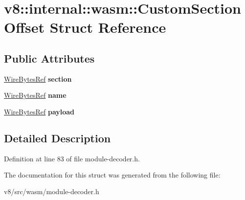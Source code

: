 \hypertarget{structv8_1_1internal_1_1wasm_1_1CustomSectionOffset}{}\section{v8\+:\+:internal\+:\+:wasm\+:\+:Custom\+Section\+Offset Struct Reference}
\label{structv8_1_1internal_1_1wasm_1_1CustomSectionOffset}
\subsection*{Public Attributes}
\begin{DoxyCompactItemize}
\item 
\mbox{\label{structv8_1_1internal_1_1wasm_1_1CustomSectionOffset_ad471a37dae6e27b7f3c1eff55993a18d}} 
\mbox{\hyperlink{classv8_1_1internal_1_1wasm_1_1WireBytesRef}{Wire\+Bytes\+Ref}} {\bfseries section}
\item 
\mbox{\label{structv8_1_1internal_1_1wasm_1_1CustomSectionOffset_ae5c3a777caa14d7298b01331c36acbf8}} 
\mbox{\hyperlink{classv8_1_1internal_1_1wasm_1_1WireBytesRef}{Wire\+Bytes\+Ref}} {\bfseries name}
\item 
\mbox{\label{structv8_1_1internal_1_1wasm_1_1CustomSectionOffset_af6e5587af3192c52206a96dfeafedb6a}} 
\mbox{\hyperlink{classv8_1_1internal_1_1wasm_1_1WireBytesRef}{Wire\+Bytes\+Ref}} {\bfseries payload}
\end{DoxyCompactItemize}


\subsection{Detailed Description}


Definition at line 83 of file module-\/decoder.\+h.



The documentation for this struct was generated from the following file\+:\begin{DoxyCompactItemize}
\item 
v8/src/wasm/module-\/decoder.\+h\end{DoxyCompactItemize}
